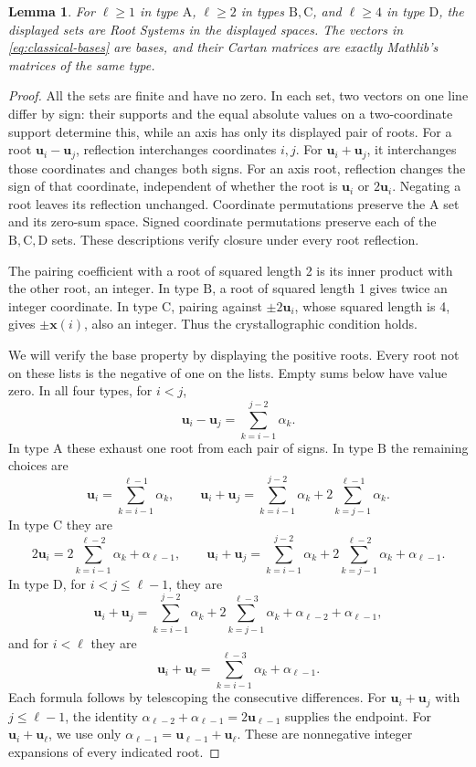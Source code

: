 \documentclass[11pt]{amsart}
\newcommand\Zu{{\mathbf u}}
\newcommand\Zx{{\mathbf x}}
\newtheorem{lemma}[theorem]{Lemma}
\theoremstyle{definition}
\newcommand{\typ}[1]{\mathrm{#1}}
\begin{document}
\begin{lemma}\label{lem:classical}
For $\ell\geq1$ in type $\typ A$, $\ell\geq2$ in types $\typ B,\typ C$,
and $\ell\geq4$ in type $\typ D$, the displayed sets are Root Systems in
the displayed spaces. The vectors in \eqref{eq:classical-bases} are bases,
and their Cartan matrices are exactly Mathlib's matrices of the same type.
\end{lemma}
\begin{proof}
All the sets are finite and have no zero. In each set, two vectors on one
line differ by sign: their supports and the equal absolute values on a
two-coordinate support determine this, while an axis has only its displayed
pair of roots. For a root $\Zu_i-\Zu_j$, reflection interchanges
coordinates $i,j$. For $\Zu_i+\Zu_j$, it interchanges those coordinates
and changes both signs. For an axis root, reflection changes the sign of
that coordinate, independent of whether the root is $\Zu_i$ or $2\Zu_i$.
Negating a root leaves its reflection unchanged. Coordinate permutations
preserve the $\typ A$ set and its zero-sum space. Signed coordinate
permutations preserve each of the $\typ B,\typ C,\typ D$ sets.
These descriptions verify closure under every root reflection.

The pairing coefficient with a root of squared length 2 is its inner
product with the other root, an integer. In type $\typ B$, a root of
squared length 1 gives twice an integer coordinate. In type $\typ C$,
pairing against $\pm2\Zu_i$, whose squared length is 4, gives
$\pm\Zx(i)$, also an integer. Thus the crystallographic condition holds.

We will verify the base property by displaying the positive roots. Every
root not on these lists is the negative of one on the lists. Empty sums
below have value zero. In all four types, for $i<j$,
\[
 \Zu_i-\Zu_j=\sum_{k=i-1}^{j-2}\alpha_k.
\]
In type $\typ A$ these exhaust one root from each pair of signs.
In type $\typ B$ the remaining choices are
\[
 \Zu_i=\sum_{k=i-1}^{\ell-1}\alpha_k,\qquad
 \Zu_i+\Zu_j=\sum_{k=i-1}^{j-2}\alpha_k+
                        2\sum_{k=j-1}^{\ell-1}\alpha_k.
\]
In type $\typ C$ they are
\[
 2\Zu_i=2\sum_{k=i-1}^{\ell-2}\alpha_k+\alpha_{\ell-1},\qquad
 \Zu_i+\Zu_j=\sum_{k=i-1}^{j-2}\alpha_k+
              2\sum_{k=j-1}^{\ell-2}\alpha_k+\alpha_{\ell-1}.
\]
In type $\typ D$, for $i<j\leq\ell-1$, they are
\[
 \Zu_i+\Zu_j=\sum_{k=i-1}^{j-2}\alpha_k+
  2\sum_{k=j-1}^{\ell-3}\alpha_k+\alpha_{\ell-2}+\alpha_{\ell-1},
\]
and for $i<\ell$ they are
\[
 \Zu_i+\Zu_\ell=\sum_{k=i-1}^{\ell-3}\alpha_k+\alpha_{\ell-1}.
\]
Each formula follows by telescoping the consecutive differences.
For $\Zu_i+\Zu_j$ with $j\leq\ell-1$, the identity
$\alpha_{\ell-2}+\alpha_{\ell-1}=2\Zu_{\ell-1}$ supplies the endpoint.
For $\Zu_i+\Zu_\ell$, we use only
$\alpha_{\ell-1}=\Zu_{\ell-1}+\Zu_\ell$.
These are nonnegative integer expansions of every indicated root.


\end{proof}
\end{document}

